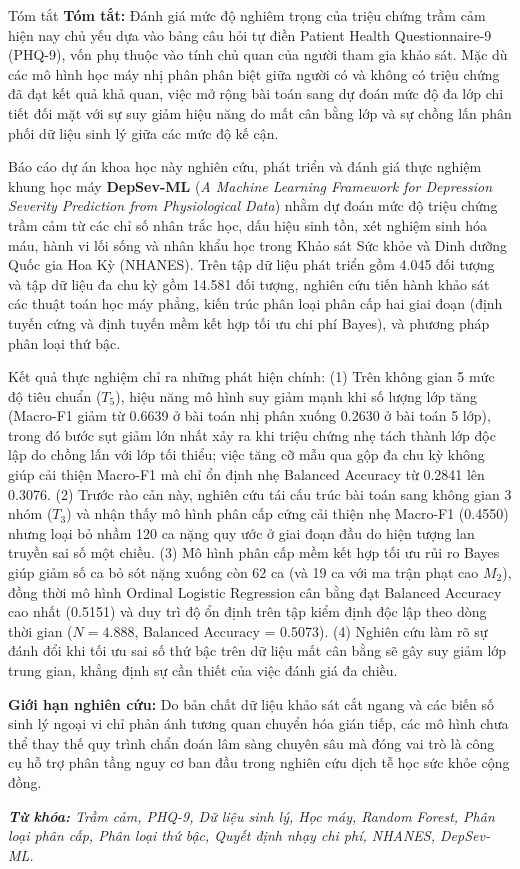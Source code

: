 \documentclass{uetgraduation}
\begin{document}
\begin{preamble}{Tóm tắt}
\textbf{Tóm tắt:} Đánh giá mức độ nghiêm trọng của triệu chứng trầm cảm hiện nay chủ yếu dựa vào bảng câu hỏi tự điền Patient Health Questionnaire-9 (PHQ-9), vốn phụ thuộc vào tính chủ quan của người tham gia khảo sát. Mặc dù các mô hình học máy nhị phân phân biệt giữa người có và không có triệu chứng đã đạt kết quả khả quan, việc mở rộng bài toán sang dự đoán mức độ đa lớp chi tiết đối mặt với sự suy giảm hiệu năng do mất cân bằng lớp và sự chồng lấn phân phối dữ liệu sinh lý giữa các mức độ kế cận.

Báo cáo dự án khoa học này nghiên cứu, phát triển và đánh giá thực nghiệm khung học máy \textbf{DepSev-ML} (\textit{A Machine Learning Framework for Depression Severity Prediction from Physiological Data}) nhằm dự đoán mức độ triệu chứng trầm cảm từ các chỉ số nhân trắc học, dấu hiệu sinh tồn, xét nghiệm sinh hóa máu, hành vi lối sống và nhân khẩu học trong Khảo sát Sức khỏe và Dinh dưỡng Quốc gia Hoa Kỳ (NHANES). Trên tập dữ liệu phát triển gồm 4.045 đối tượng và tập dữ liệu đa chu kỳ gồm 14.581 đối tượng, nghiên cứu tiến hành khảo sát các thuật toán học máy phẳng, kiến trúc phân loại phân cấp hai giai đoạn (định tuyến cứng và định tuyến mềm kết hợp tối ưu chi phí Bayes), và phương pháp phân loại thứ bậc.

Kết quả thực nghiệm chỉ ra những phát hiện chính: (1) Trên không gian 5 mức độ tiêu chuẩn ($T_5$), hiệu năng mô hình suy giảm mạnh khi số lượng lớp tăng (Macro-F1 giảm từ 0.6639 ở bài toán nhị phân xuống 0.2630 ở bài toán 5 lớp), trong đó bước sụt giảm lớn nhất xảy ra khi triệu chứng nhẹ tách thành lớp độc lập do chồng lấn với lớp tối thiểu; việc tăng cỡ mẫu qua gộp đa chu kỳ không giúp cải thiện Macro-F1 mà chỉ ổn định nhẹ Balanced Accuracy từ 0.2841 lên 0.3076. (2) Trước rào cản này, nghiên cứu tái cấu trúc bài toán sang không gian 3 nhóm ($T_3$) và nhận thấy mô hình phân cấp cứng cải thiện nhẹ Macro-F1 (0.4550) nhưng loại bỏ nhầm 120 ca nặng quy ước ở giai đoạn đầu do hiện tượng lan truyền sai số một chiều. (3) Mô hình phân cấp mềm kết hợp tối ưu rủi ro Bayes giúp giảm số ca bỏ sót nặng xuống còn 62 ca (và 19 ca với ma trận phạt cao $M_2$), đồng thời mô hình Ordinal Logistic Regression cân bằng đạt Balanced Accuracy cao nhất (0.5151) và duy trì độ ổn định trên tập kiểm định độc lập theo dòng thời gian ($N = 4.888$, Balanced Accuracy = 0.5073). (4) Nghiên cứu làm rõ sự đánh đổi khi tối ưu sai số thứ bậc trên dữ liệu mất cân bằng sẽ gây suy giảm lớp trung gian, khẳng định sự cần thiết của việc đánh giá đa chiều.

\textbf{Giới hạn nghiên cứu:} Do bản chất dữ liệu khảo sát cắt ngang và các biến số sinh lý ngoại vi chỉ phản ánh tương quan chuyển hóa gián tiếp, các mô hình chưa thể thay thế quy trình chẩn đoán lâm sàng chuyên sâu mà đóng vai trò là công cụ hỗ trợ phân tầng nguy cơ ban đầu trong nghiên cứu dịch tễ học sức khỏe cộng đồng.

\vspace{0.6cm}
\noindent \textit{\textbf{Từ khóa:} Trầm cảm, PHQ-9, Dữ liệu sinh lý, Học máy, Random Forest, Phân loại phân cấp, Phân loại thứ bậc, Quyết định nhạy chi phí, NHANES, DepSev-ML.}
\end{preamble}
\end{document}
